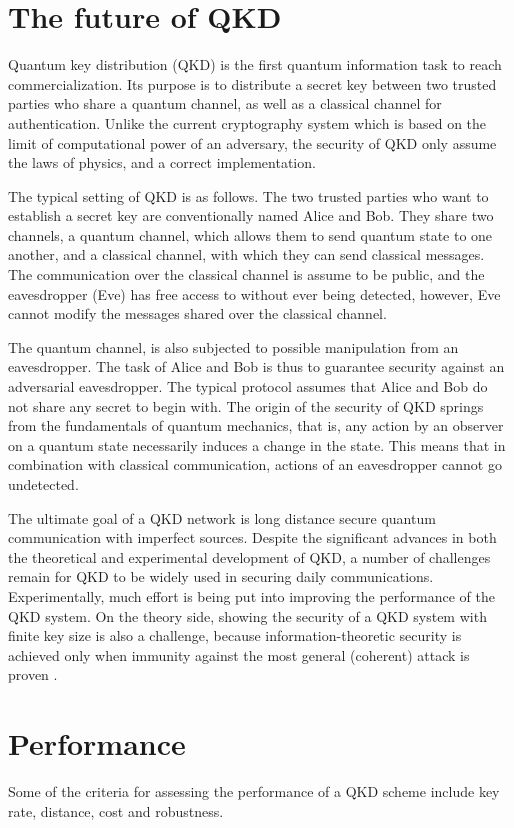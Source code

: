 \section{The future of QKD}
% 
Quantum key distribution (QKD) is the first quantum information task
to reach commercialization. Its purpose is to distribute a secret
key between two trusted parties who share a quantum channel,
as well as a classical channel for authentication. Unlike the current
cryptography system which is based on the limit of computational power of an adversary, the security of QKD only assume the laws of physics, and a 
correct implementation.


The typical setting of QKD is as follows. The two trusted parties who
want to establish a secret key are conventionally named Alice and Bob.
They share two channels, a quantum channel, which allows them to send
quantum state to one another, and a classical channel, with which they can
send classical messages. The communication over the classical channel is
assume to be public, and the eavesdropper (Eve) has free access to without 
ever being detected, however, Eve cannot modify the messages shared over
the classical channel.

 The quantum channel, is also subjected to possible manipulation from an
 eavesdropper. The task of Alice and Bob is thus to guarantee security
against an adversarial eavesdropper. The typical protocol assumes that
Alice and Bob do not share any secret to begin with.
The origin of the security of QKD springs from the fundamentals
of quantum mechanics, that is, any action by an observer on
a quantum state necessarily induces a change in the state. This means
that in combination with classical communication, actions of an eavesdropper cannot go undetected.


The ultimate goal of a QKD network is long distance secure quantum communication with imperfect sources.
% 
Despite the significant advances in both the theoretical and experimental development of QKD, a number of challenges remain for QKD to be widely used 
in securing daily communications\cite{RevModPhys.81.1301,diamanti2016practical}. Experimentally, much effort is being put into improving the performance of the QKD system. On the theory side, 
showing the security of a QKD system with finite key size is also a challenge,  
because information-theoretic security is achieved only when immunity against the most general (coherent) attack is proven \cite{diamanti2016practical}.


\section{Performance}
Some of the criteria for assessing the performance of a QKD scheme include key rate, distance, cost and robustness.
% 
